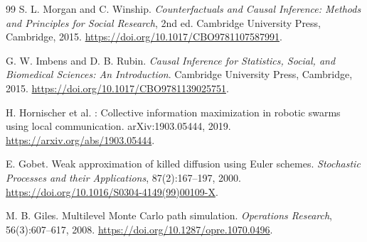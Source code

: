 \documentclass{article}
\begin{document}
\begin{thebibliography}{99}
S. L. Morgan and C. Winship.
\newblock \emph{Counterfactuals and Causal Inference: Methods and Principles
for Social Research}, 2nd ed.
\newblock Cambridge University Press, Cambridge, 2015.
\newblock \url{https://doi.org/10.1017/CBO9781107587991}.

G. W. Imbens and D. B. Rubin.
\newblock \emph{Causal Inference for Statistics, Social, and Biomedical
Sciences: An Introduction}.
\newblock Cambridge University Press, Cambridge, 2015.
\newblock \url{https://doi.org/10.1017/CBO9781139025751}.


H. Hornischer et al.
: Collective information maximization in robotic swarms using
local communication.
\newblock arXiv:1903.05444, 2019.
\newblock \url{https://arxiv.org/abs/1903.05444}.

E. Gobet.
\newblock Weak approximation of killed diffusion using {E}uler schemes.
\newblock \emph{Stochastic Processes and their Applications}, 87(2):167--197,
2000.
\newblock \url{https://doi.org/10.1016/S0304-4149(99)00109-X}.

M. B. Giles.
\newblock Multilevel {M}onte {C}arlo path simulation.
\newblock \emph{Operations Research}, 56(3):607--617, 2008.
\newblock \url{https://doi.org/10.1287/opre.1070.0496}.

\end{thebibliography}
\end{document}
